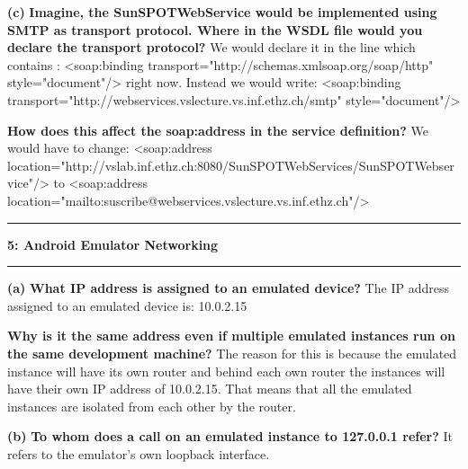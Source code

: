 \documentclass[11pt]{article}
\newcommand\question[2]{\vspace{.25in}\hrule\textbf{#1: #2}\vspace{.5em}\hrule\vspace{.10in}}
\renewcommand\part[1]{\vspace{.10in}\textbf{(#1)}}
\begin{document}
\part{c} \textbf{Imagine, the SunSPOTWebService would be implemented using SMTP as transport protocol. Where in the WSDL file would you declare the transport protocol? }\newline
We would declare it in the line which contains : \newline
\textless soap:binding transport="http://schemas.xmlsoap.org/soap/http" style="document"/\textgreater \newline
right now. \newline
Instead we would write: \newline
\textless soap:binding transport="http://webservices.vslecture.vs.inf.ethz.ch/smtp" style="document"/\textgreater \newline

\textbf{How does this affect the soap:address in the service definition?}\newline
We would have to change: \newline
\textless soap:address location="http://vslab.inf.ethz.ch:8080/SunSPOTWebServices/SunSPOTWebservice"/\textgreater\newline
 to \textless soap:address location="mailto:suscribe@webservices.vslecture.vs.inf.ethz.ch"/\textgreater




\question{5}{Android Emulator Networking} 

\part{a} \textbf{What IP address is assigned to an emulated device?}\newline
The IP address assigned to an emulated device is: 10.0.2.15\newline

\textbf{Why is it the same address even if multiple emulated instances run on the same development machine?}\newline
The reason for this is because the emulated instance will have its own router and behind each own router the instances will have their own IP address of 10.0.2.15. That means that all the emulated instances are isolated from each other by the router.

\part{b} \textbf{To whom does a call on an emulated instance to 127.0.0.1 refer?}\newline
It refers to the emulator's own loopback interface.
\end{document}
